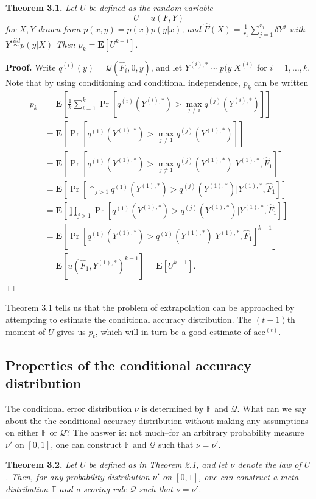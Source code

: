 \documentclass{article}
\newcommand{\E}{\textbf{E}}
\begin{document}
\noindent\textbf{Theorem 3.1.} \emph{
Let $U$ be defined as the random variable
\[U = u(F, Y)\]
for $X, Y$ drawn from $p(x, y) = p(x) p(y|x)$,
and $\hat{F}(X) = \frac{1}{r_1}\sum_{j=1}^{r_1} \delta{Y^j}$ with $Y^i \stackrel{iid}{\sim} p(y|X)$
Then $p_k = \E[U^{k-1}]$.
}

\noindent\textbf{Proof.}  
Write $q^{(i)}(y) = \mathcal{Q}(\hat{F}_i, 0, y)$, and let $Y^{(i), *} \sim p(y|X^{(i)}$ for $i = 1,\hdots, k$.
Note that by using conditioning and
conditional independence, $p_k$ can be written
\begin{align*}
p_k &= \E\left[ \frac{1}{k}\sum_{i=1}^k  \Pr[q^{(i)}(Y^{(i), *}) > \max_{j\neq i} q^{(j)}(Y^{(i), *})] \right]
\\&= \E\left[ \Pr[q^{(1)}(Y^{(1), *}) > \max_{j\neq 1} q^{(j)}(Y^{(1), *})] \right]
\\&= \E[\Pr[q^{(1)}(Y^{(1), *}) > \max_{j\neq 1} q^{(j)}(Y^{(1), *})|Y^{(1), *}, \hat{F}_1]]
\\&= \E[\Pr[\cap_{j > 1} q^{(1)}(Y^{(1), *}) > q^{(j)}(Y^{(1), *})|Y^{(1), *}, \hat{F}_1]]
\\&= \E[\prod_{j > 1}\Pr[q^{(1)}(Y^{(1), *}) > q^{(j)}(Y^{(1), *})|Y^{(1), *}, \hat{F}_1]]
\\&= \E[\Pr[q^{(1)}(Y^{(1), *}) > q^{(2)}(Y^{(1), *})|Y^{(1), *}, \hat{F}_1]^{k-1}]
\\&= \E[u(\hat{F}_1, Y^{(1), *})^{k-1}] = \E[U^{k-1}].
\end{align*}
$\Box$

Theorem 3.1 tells us that the problem of extrapolation can be
approached by attempting to estimate the conditional accuracy
distribution.  The $(t-1)$th moment of $U$ gives us $p_t$, which will
in turn be a good estimate of $\text{acc}^{(t)}$.

\subsection{Properties of the conditional accuracy distribution}

The conditional error distribution $\nu$ is determined by $\mathbb{F}$
and $\mathcal{Q}$.  What can we say about the the conditional accuracy
distribution without making any assumptions on either $\mathbb{F}$ or
$\mathcal{Q}$?  The answer is: not much--for an arbitrary probability
measure $\nu'$ on $[0,1]$, one can construct $\mathbb{F}$ and
$\mathcal{Q}$ such that $\nu = \nu'$.

\noindent\textbf{Theorem 3.2.} \emph{ Let $U$ be defined as in Theorem
  2.1, and let $\nu$ denote the law of $U$.  Then, for any probability
  distribution $\nu'$ on $[0,1]$, one can construct a
  meta-distribution $\mathbb{F}$ and a scoring rule $\mathcal{Q}$ such
  that $\nu = \nu'$.  }
\end{document}
